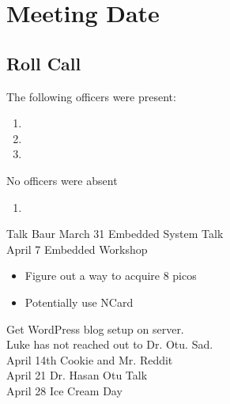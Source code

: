 \section*{Meeting Date}

\subsection{Roll Call}

The following officers were present:

\begin{enumerate}
    \item \president
    \item \tresurer
    \item \primaryprogrammer
    
\end{enumerate}

No officers were absent

\begin{enumerate}
    \item \secretary
\end{enumerate}

Talk Baur March 31 Embedded System Talk \\
April 7 Embedded Workshop \\

\begin{itemize}
    \item Figure out a way to acquire 8 picos
    \item Potentially use NCard
\end{itemize}

Get WordPress blog setup on server.\\

Luke has not reached out to Dr. Otu. Sad.\\

April 14th Cookie and Mr. Reddit\\
April 21 Dr. Hasan Otu Talk\\
April 28 Ice Cream Day
